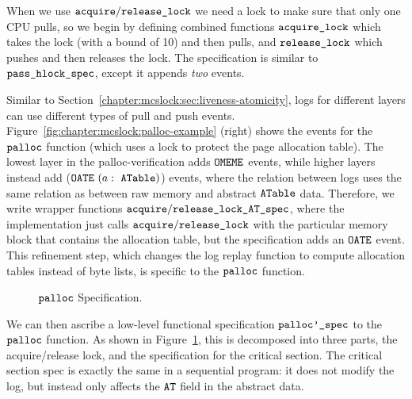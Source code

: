 When we use ${\mathrm{\texttt{acquire}}}/{\mathrm{\texttt{release\_lock}}}$ we
need a lock to make sure that only one CPU pulls, so we begin
by defining combined functions ${\mathrm{\texttt{acquire\_lock}}}$ which
takes the lock (with a bound of 10) and then pulls, and
${\mathrm{\texttt{release\_lock}}}$ which pushes and then releases the
lock. The specification is similar to ${\mathrm{\texttt{pass\_hlock\_spec}}}$,
except it appends \emph{two} events.

Similar to Section~\ref{chapter:mcslock:sec:liveness-atomicity}, logs for different
layers can use different types of pull and push events.
Figure~\ref{fig:chapter:mcslock:palloc-example} (right) shows the events for the
${\mathrm{\texttt{palloc}}}$ function (which uses a lock to protect the page
allocation table). The lowest layer in the palloc-verification adds
${\mathrm{\texttt{OMEME}}}$ events, while higher layers instead add
(${\mathrm{\texttt{OATE}}}~{(a:\ {\mathrm{\texttt{ATable}}})}$) events, where the relation between logs
uses the same relation as between raw memory and abstract
${\mathrm{\texttt{ATable}}}$ data. Therefore, we write wrapper functions
${\mathrm{\texttt{acquire}}}/{\mathrm{\texttt{release\_lock\_AT\_spec}}}$, where the
implementation just calls ${\mathrm{\texttt{acquire}}}/{\mathrm{\texttt{release\_lock}}}$
with the particular memory block that contains the allocation table,
but the specification adds an ${\mathrm{\texttt{OATE}}}$ event.
This refinement step, which changes the log replay function to compute
allocation tables instead of byte lists, is
specific to the ${\mathrm{\texttt{palloc}}}$ function.

\begin{figure}




\caption{${\mathrm{\texttt{palloc}}}$ Specification.}
\label{fig:chapter:mcslock:palloc-spec}
\end{figure}

We can then ascribe a low-level functional specification
${\mathrm{\texttt{palloc'\_spec}}}$ to the ${\mathrm{\texttt{palloc}}}$ function. As shown
in Figure~\ref{fig:chapter:mcslock:palloc-spec}, this is decomposed into three parts, the
acquire/release lock, and the specification for the critical
section. The critical section spec is exactly the same in a sequential
program: it does not modify the log, but instead only affects the ${\mathrm{\texttt{AT}}}$ field in the abstract data.

